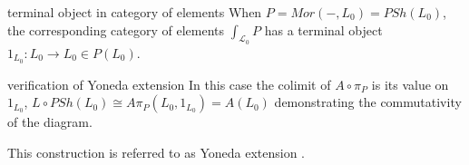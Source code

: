 \begin{frame}
\begin{block}{terminal object in category of elements}
When $P = Mor(-,L_0) = PSh(L_0)$, the corresponding category of elements $\int_{\mathcal{L}_0} P$ has a terminal object $1_{L_0} : L_0 \rightarrow L_0 \in P(L_0)$.
\end{block}
\begin{block}{verification of Yoneda extension}
In this case the colimit of $A \circ \pi_P$ is its value on $1_{L_0}$, $L \circ PSh(L_0) \cong A \pi_P (L_0,1_{L_0}) = A(L_0)$ demonstrating the commutativity of the diagram.
\end{block}
This construction is referred to as Yoneda extension \cite{Lane1998,MacLane1992}.
\end{frame}